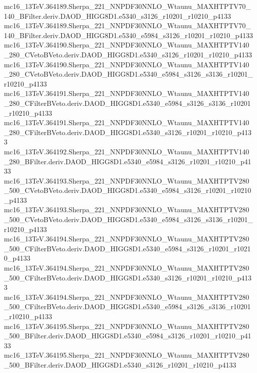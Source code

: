 \begin{scriptsize}
mc16\_13TeV.364189.Sherpa\_221\_NNPDF30NNLO\_Wtaunu\_MAXHTPTV70\_140\_BFilter.deriv.DAOD\_HIGG8D1.e5340\_s3126\_r10201\_r10210\_p4133 \\
mc16\_13TeV.364189.Sherpa\_221\_NNPDF30NNLO\_Wtaunu\_MAXHTPTV70\_140\_BFilter.deriv.DAOD\_HIGG8D1.e5340\_e5984\_s3126\_r10201\_r10210\_p4133 \\
mc16\_13TeV.364190.Sherpa\_221\_NNPDF30NNLO\_Wtaunu\_MAXHTPTV140\_280\_CVetoBVeto.deriv.DAOD\_HIGG8D1.e5340\_s3126\_r10201\_r10210\_p4133 \\
mc16\_13TeV.364190.Sherpa\_221\_NNPDF30NNLO\_Wtaunu\_MAXHTPTV140\_280\_CVetoBVeto.deriv.DAOD\_HIGG8D1.e5340\_e5984\_s3126\_s3136\_r10201\_r10210\_p4133 \\
mc16\_13TeV.364191.Sherpa\_221\_NNPDF30NNLO\_Wtaunu\_MAXHTPTV140\_280\_CFilterBVeto.deriv.DAOD\_HIGG8D1.e5340\_e5984\_s3126\_s3136\_r10201\_r10210\_p4133 \\
mc16\_13TeV.364191.Sherpa\_221\_NNPDF30NNLO\_Wtaunu\_MAXHTPTV140\_280\_CFilterBVeto.deriv.DAOD\_HIGG8D1.e5340\_s3126\_r10201\_r10210\_p4133 \\
mc16\_13TeV.364192.Sherpa\_221\_NNPDF30NNLO\_Wtaunu\_MAXHTPTV140\_280\_BFilter.deriv.DAOD\_HIGG8D1.e5340\_e5984\_s3126\_r10201\_r10210\_p4133 \\
mc16\_13TeV.364193.Sherpa\_221\_NNPDF30NNLO\_Wtaunu\_MAXHTPTV280\_500\_CVetoBVeto.deriv.DAOD\_HIGG8D1.e5340\_e5984\_s3126\_r10201\_r10210\_p4133 \\
mc16\_13TeV.364193.Sherpa\_221\_NNPDF30NNLO\_Wtaunu\_MAXHTPTV280\_500\_CVetoBVeto.deriv.DAOD\_HIGG8D1.e5340\_e5984\_s3126\_s3136\_r10201\_r10210\_p4133 \\
mc16\_13TeV.364194.Sherpa\_221\_NNPDF30NNLO\_Wtaunu\_MAXHTPTV280\_500\_CFilterBVeto.deriv.DAOD\_HIGG8D1.e5340\_e5984\_s3126\_r10201\_r10210\_p4133 \\
mc16\_13TeV.364194.Sherpa\_221\_NNPDF30NNLO\_Wtaunu\_MAXHTPTV280\_500\_CFilterBVeto.deriv.DAOD\_HIGG8D1.e5340\_s3126\_r10201\_r10210\_p4133 \\
mc16\_13TeV.364194.Sherpa\_221\_NNPDF30NNLO\_Wtaunu\_MAXHTPTV280\_500\_CFilterBVeto.deriv.DAOD\_HIGG8D1.e5340\_e5984\_s3126\_s3136\_r10201\_r10210\_p4133 \\
mc16\_13TeV.364195.Sherpa\_221\_NNPDF30NNLO\_Wtaunu\_MAXHTPTV280\_500\_BFilter.deriv.DAOD\_HIGG8D1.e5340\_e5984\_s3126\_r10201\_r10210\_p4133 \\
mc16\_13TeV.364195.Sherpa\_221\_NNPDF30NNLO\_Wtaunu\_MAXHTPTV280\_500\_BFilter.deriv.DAOD\_HIGG8D1.e5340\_s3126\_r10201\_r10210\_p4133 \\

\end{scriptsize}
